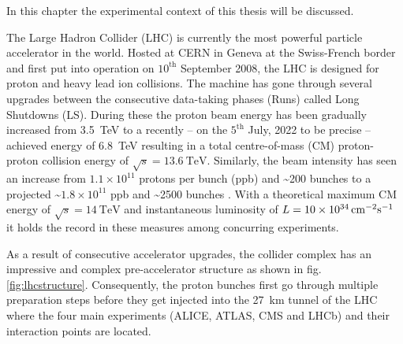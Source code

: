 
In this chapter the experimental context of this thesis will be discussed. 

\label{sec:theory}

The Large Hadron Collider (LHC) is currently the most powerful particle accelerator in the world. Hosted at CERN in Geneva at the Swiss-French border and first put into operation on $\text{10}^\text{th}$ September 2008, the LHC is designed for proton and heavy lead ion collisions. The machine has gone through several upgrades between the consecutive data-taking phases (Runs) called Long Shutdowns (LS). During these the proton beam energy has been gradually increased from \SI{3.5}{\tera\electronvolt} to a recently -- on the $\text{5}^{\text{th}}$ July, 2022 to be precise -- achieved energy of \SI{6.8}{\tera\electronvolt} \cite{Alici:2773265} resulting in a total centre-of-mass (CM) proton-proton collision energy of $\sqrt{s} = \SI{13.6}{\tera\electronvolt}$. Similarly, the beam intensity has seen an increase from $1.1 \times 10^{11}$ protons per bunch (ppb) and \textasciitilde200 bunches to a projected \textasciitilde$1.8 \times 10^{11}$ ppb and \textasciitilde2500 bunches \cite{Fartoukh:2790409, Karastathis:2750302}. With a theoretical maximum CM energy of $\sqrt{s} = \SI{14}{\tera\electronvolt}$ and instantaneous luminosity of $L = \SI{10d34}{\centi\meter^{-2}\second^{-1}}$ it holds the record in these measures among concurring experiments.

As a result of consecutive accelerator upgrades, the collider complex has an impressive and complex pre-accelerator structure as shown in fig. \ref{fig:lhcstructure}. Consequently, the proton bunches first go through multiple preparation steps before they get injected into the \SI{27}{\kilo\meter} tunnel of the LHC where the four main experiments (ALICE, ATLAS, CMS and LHCb) and their interaction points are located. 


